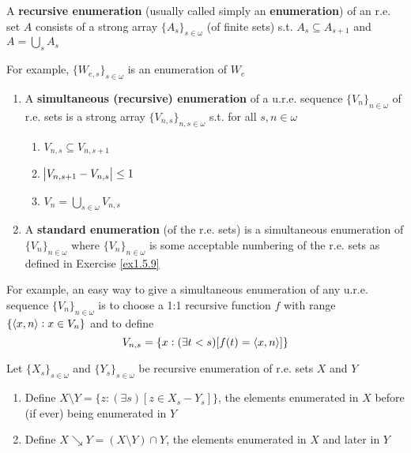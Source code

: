 \documentclass[11pt]{article}
\begin{document}
\begin{definition}[]
A \textbf{recursive enumeration} (usually called simply an \textbf{enumeration}) of an r.e.
set \(A\) consists of a strong array \(\{A_s\}_{s\in\omega}\) (of finite
sets) s.t. \(A_s\subseteq A_{s+1}\) and \(A=\bigcup_s A_s\)
\end{definition}

For example, \(\{W_{e,s}\}_{s\in\omega}\) is an enumeration of \(W_e\)

\begin{definition}[]
\begin{enumerate}
\item A \textbf{simultaneous (recursive) enumeration} of a u.r.e. sequence
\(\{V_n\}_{n\in\omega}\) of r.e. sets is a strong array
\(\{V_{n,s}\}_{n,s\in\omega}\) s.t. for all \(s,n\in\omega\)
\begin{enumerate}
\item \(V_{n,s}\subseteq V_{n,s+1}\)
\item \(\abs{V_{n,s+1}-V_{n,s}}\le1\)
\item \(V_n=\bigcup_{s\in\omega}V_{n,s}\)
\end{enumerate}
\item A \textbf{standard enumeration} (of the r.e. sets) is a simultaneous enumeration
of \(\{V_n\}_{n\in\omega}\) where \(\{V_n\}_{n\in\omega}\) is some
acceptable numbering of the r.e. sets as defined in Exercise \ref{ex1.5.9}
\end{enumerate}
\end{definition}

For example, an easy way to give a simultaneous enumeration of any u.r.e.
sequence \(\{V_n\}_{n\in\omega}\) is to choose a 1:1 recursive function \(f\)
with range \(\{\langle x,n\rangle:x\in V_n\}\) and to define
\begin{equation*}
V_{n,s}=\{x: (\exists t<s)[f(t)=\langle x,n\rangle]\}
\end{equation*}

\begin{definition}[]
Let \(\{X_s\}_{s\in\omega}\) and \(\{Y_s\}_{s\in\omega}\) be recursive
enumeration of r.e. sets \(X\) and \(Y\)
\begin{enumerate}
\item Define \(X\setminus Y=\{z: (\exists s)[z\in X_s-Y_s]\}\), the elements
enumerated in \(X\) before (if ever) being enumerated in \(Y\)
\item Define \(X\searrow Y=(X\setminus Y)\cap Y\), the elements enumerated in
\(X\) and later in \(Y\)
\end{enumerate}
\end{definition}
\end{document}
